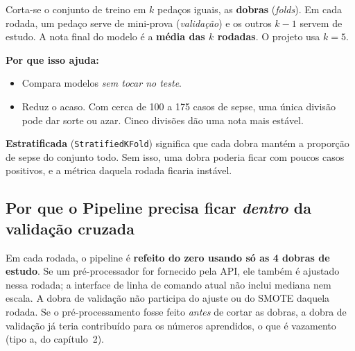 \documentclass[11pt,a4paper]{article}
\newcommand{\cod}[1]{\texttt{#1}}
\begin{document}
\begin{conceito}
Corta-se o conjunto de treino em $k$ pedaços iguais, as \textbf{dobras} (\emph{folds}). Em cada rodada, um pedaço serve de
mini-prova (\emph{validação}) e os outros $k-1$ servem de estudo. A nota final do modelo é a \textbf{média das $k$ rodadas}.
O projeto usa $k=5$.
\end{conceito}

\begin{center}
\end{center}

\textbf{Por que isso ajuda:}
\begin{itemize}
  \item Compara modelos \emph{sem tocar no teste}.
  \item Reduz o acaso. Com cerca de 100 a 175 casos de sepse, uma única divisão pode dar sorte ou azar. Cinco divisões dão uma nota mais estável.
\end{itemize}

\textbf{Estratificada} (\cod{StratifiedKFold}) significa que cada dobra mantém a proporção de sepse do conjunto todo. Sem isso, uma dobra poderia ficar com poucos casos positivos, e a métrica daquela rodada ficaria instável.

\subsection{Por que o Pipeline precisa ficar \emph{dentro} da validação cruzada}

Em cada rodada, o pipeline é \textbf{refeito do zero usando só as 4 dobras de estudo}. Se um pré-processador for fornecido pela API, ele também é ajustado nessa rodada; a interface de linha de comando atual não inclui mediana nem escala.
A dobra de validação não participa do ajuste ou do SMOTE daquela rodada. Se o pré-processamento fosse feito
\emph{antes} de cortar as dobras, a dobra de validação já teria contribuído para os números aprendidos, o que é
vazamento (tipo a, do capítulo~2).
\end{document}
